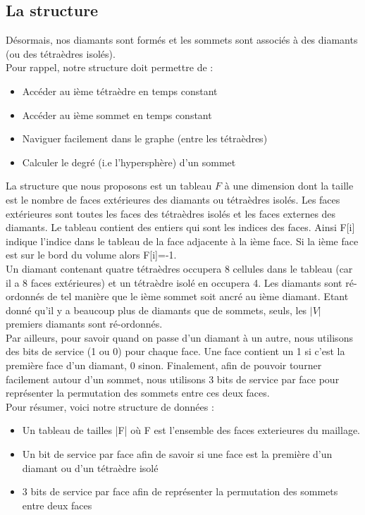\documentclass[a4paper,11pt,openany]{article}
\begin{document}
\subsection{La structure}
\noindent
Désormais, nos diamants sont formés et les sommets sont associés à des diamants (ou des tétraèdres isolés).\\
Pour rappel, notre structure doit permettre de :
\begin{itemize}
\item Accéder au ième tétraèdre en temps constant
\item Accéder au ième sommet en temps constant
\item Naviguer facilement dans le graphe (entre les tétraèdres)
\item Calculer le degré (i.e l'hypersphère) d'un sommet
\end{itemize}
La structure que nous proposons est un tableau $F$ à une dimension dont la taille est le nombre de faces extérieures des diamants ou tétraèdres isolés. Les faces extérieures sont toutes les faces des tétraèdres isolés et les faces externes des diamants. Le tableau contient des entiers qui sont les indices des faces. Ainsi F[i] indique l'indice dans le tableau de la face adjacente à la ième face. Si la ième face est sur le bord du volume alors F[i]=-1.\\ 
Un diamant contenant quatre tétraèdres occupera 8 cellules dans le tableau (car il a 8 faces extérieures) et un tétraèdre isolé en occupera 4. Les diamants sont ré-ordonnés de tel manière que le ième sommet soit ancré au ième diamant. Etant donné qu'il y a beaucoup plus de diamants que de sommets, seuls, les $|V|$ premiers diamants sont ré-ordonnés.\\
Par ailleurs, pour savoir quand on passe d'un diamant à un autre, nous utilisons des bits de service (1 ou 0) pour chaque face. Une face contient un 1 si c'est la première face d'un diamant, 0 sinon. Finalement, afin de pouvoir tourner facilement autour d'un sommet, nous utilisons 3 bits de service par face pour représenter la permutation des sommets entre ces deux faces.\\
Pour résumer, voici notre structure de données :
\begin{itemize}
\item Un tableau de tailles |F| où F est l'ensemble des faces exterieures du maillage.
\item Un bit de service par face afin de savoir si une face est la première d'un diamant ou d'un tétraèdre isolé
\item 3 bits de service par face afin de représenter la permutation des sommets entre deux faces
\end{itemize}
\end{document}
